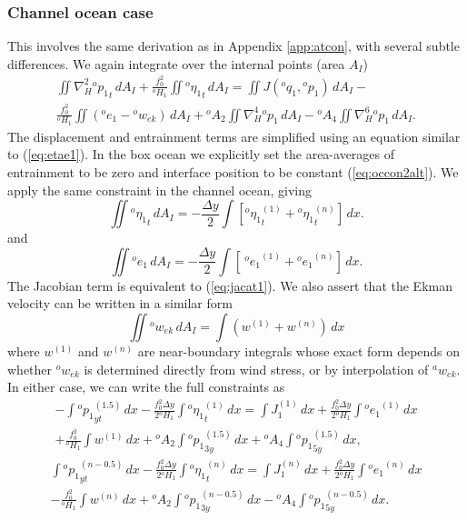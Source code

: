 \documentclass[11pt, a4paper,twoside]{article}
\newcommand{\etb}[2]{{{}^{#1}\eta_{#2}}}
\newcommand{\q}[2]{{{}^{#1}q_{#2}}}
\newcommand{\p}[2]{{{}^{#1}p_{#2}}}
\newcommand{\ek}[1]{{{}^{#1}w_{ek}}}
\newcommand{\HH}[2]{{{}^{#1}H_{#2}}}
\newcommand{\at}[1]{{{}^{#1}A_2}}
\newcommand{\ah}[1]{{{}^{#1}A_4}}
\newcommand{\e}[2]{{{}^{#1}e_{#2}}}
\numberwithin{equation}{section}
\begin{document}
\subsubsection{Channel ocean case}\label{app:chancon}
This involves the same derivation as in Appendix \ref{app:atcon}, with several subtle differences.
We again integrate over the internal points (area $A_I$)
\begin{multline}
\iint \nabla_H^2\p{o}{1}_t \, dA_I  + \frac{f_0^2}{\HH{o}{1}}\iint\etb{o}{1}_t \, dA_I = \iint J(\q{o}{1},\p{o}{1})\, dA_I  -\\
 \frac{f_0^2}{\HH{o}{1}}\iint (\e{o}{1} - \ek{o}) \, dA_I + \at{o} \iint \nabla_H^4 \p{o}{1} \,dA_I- \ah{o} \iint \nabla_H^6 \p{o}{1} \,dA_I.
\end{multline}
The displacement and entrainment terms are simplified using an equation similar to (\ref{eq:etae1}). In the box ocean we explicitly set the area-averages of entrainment to be zero and interface position to be constant (\ref{eq:occon2alt}).
We apply the same constraint in the channel ocean, giving
\begin{equation}
\iint \etb{o}{1}_t  \, dA_I = - \frac{\Delta y}{2}\int\left[\etb{o}{1}_t^{(1)} + \etb{o}{1}_t^{(n)}\right] \, dx.
\end{equation}
and
\begin{equation}
\iint \e{o}{1}  \, dA_I = - \frac{\Delta y}{2}\int\left[\  \e{o}{1} ^{(1)} +  \e{o}{1} ^{(n)}\right] \, dx.
\end{equation}
The Jacobian term is equivalent to (\ref{eq:jacat1}).
We also assert that the Ekman velocity can be written in a similar form
\begin{equation}
\label{eq:wekconst1}
\iint \ek{o} \, dA_I = \int \left( w^{(1)} + w^{(n)} \right) \, dx
\end{equation}
where $w^{(1)}$ and $w^{(n)}$ are near-boundary integrals whose exact form depends
on whether $\ek{o}$ is determined directly from wind stress, or by interpolation
of $\ek{a}$. 
In either case, we can write the full constraints as
\begin{multline}\label{eq:south1alt}
- \int \p{o}{1}_{yt}^{(1.5)}\, dx  - \frac{f_0^2 \Delta y}{2 \HH{o}{1}}\int \etb{o}{1}_t^{(1)} \, dx =  \int J_1^{(1)}\, dx + \frac{f_0^2 \Delta y}{2 \HH{o}{1}}\int \e{o}{1}^{(1)}\, dx \\
+\frac{f_0^2}{\HH{o}{1}}\int w^{(1)} \, dx  + \at{o} \int \p{o}{1}_{3y}^{(1.5)}\, dx+ \ah{o} \int \p{o}{1}_{5y}^{(1.5)}\, dx,
\end{multline}
\begin{multline}\label{eq:north1alt}
\int \p{o}{1}_{yt}^{(n-0.5)}\, dx  - \frac{f_0^2 \Delta y}{2 \HH{o}{1}}\int \etb{o}{1}_t^{(n)} \, dx = \int J_1^{(n)}\, dx + \frac{f_0^2 \Delta y}{2 \HH{o}{1}}\int \e{o}{1}^{(n)}\, dx \\
- \frac{f_0^2}{\HH{o}{1}}\int w^{(n)} \, dx  + \at{o} \int \p{o}{1}_{3y}^{(n-0.5)}\, dx- \ah{o} \int \p{o}{1}_{5y}^{(n-0.5)}\, dx.
\end{multline}
\end{document}
